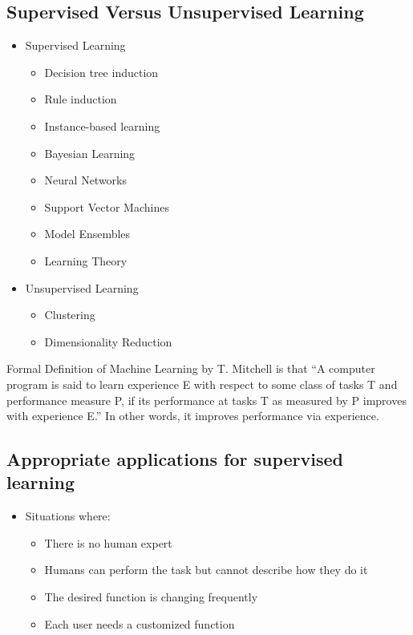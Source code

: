 \subsection{Supervised Versus Unsupervised Learning}
\begin{itemize}
  \item Supervised Learning
  \begin{itemize}
    \item Decision tree induction
    \item Rule induction
    \item Instance-based learning
    \item Bayesian Learning
    \item Neural Networks
    \item Support Vector Machines
    \item Model Ensembles
    \item Learning Theory
  \end{itemize}
  \item Unsupervised Learning
  \begin{itemize}
    \item Clustering
    \item Dimensionality Reduction
  \end{itemize}
\end{itemize}
Formal Definition of Machine Learning by T. Mitchell is that ``A computer program is said to learn experience E with respect to some class of tasks T and performance measure P, if its performance at tasks T as measured by P improves with experience E.'' In other words, it improves performance via experience.

\subsection{Appropriate applications for supervised learning}
\begin{itemize}
  \item Situations where:
  \begin{itemize}
    \item There is no human expert
    \item Humans can perform the task but cannot describe how they do it
    \item The desired function is changing frequently
    \item Each user needs a customized function
  \end{itemize}
\end{itemize}

